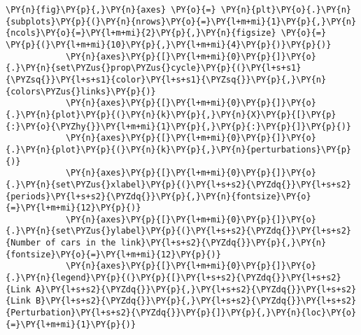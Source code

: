 \begin{Verbatim}[commandchars=\\\{\}]
            \PY{n}{fig}\PY{p}{,}\PY{n}{axes} \PY{o}{=} \PY{n}{plt}\PY{o}{.}\PY{n}{subplots}\PY{p}{(}\PY{n}{nrows}\PY{o}{=}\PY{l+m+mi}{1}\PY{p}{,}\PY{n}{ncols}\PY{o}{=}\PY{l+m+mi}{2}\PY{p}{,}\PY{n}{figsize} \PY{o}{=} \PY{p}{(}\PY{l+m+mi}{10}\PY{p}{,}\PY{l+m+mi}{4}\PY{p}{)}\PY{p}{)}
            \PY{n}{axes}\PY{p}{[}\PY{l+m+mi}{0}\PY{p}{]}\PY{o}{.}\PY{n}{set\PYZus{}prop\PYZus{}cycle}\PY{p}{(}\PY{l+s+s1}{\PYZsq{}}\PY{l+s+s1}{color}\PY{l+s+s1}{\PYZsq{}}\PY{p}{,}\PY{n}{colors\PYZus{}links}\PY{p}{)}
            \PY{n}{axes}\PY{p}{[}\PY{l+m+mi}{0}\PY{p}{]}\PY{o}{.}\PY{n}{plot}\PY{p}{(}\PY{n}{k}\PY{p}{,}\PY{n}{X}\PY{p}{[}\PY{p}{:}\PY{o}{\PYZhy{}}\PY{l+m+mi}{1}\PY{p}{,}\PY{p}{:}\PY{p}{]}\PY{p}{)}
            \PY{n}{axes}\PY{p}{[}\PY{l+m+mi}{0}\PY{p}{]}\PY{o}{.}\PY{n}{plot}\PY{p}{(}\PY{n}{k}\PY{p}{,}\PY{n}{perturbations}\PY{p}{)}
            \PY{n}{axes}\PY{p}{[}\PY{l+m+mi}{0}\PY{p}{]}\PY{o}{.}\PY{n}{set\PYZus{}xlabel}\PY{p}{(}\PY{l+s+s2}{\PYZdq{}}\PY{l+s+s2}{periods}\PY{l+s+s2}{\PYZdq{}}\PY{p}{,}\PY{n}{fontsize}\PY{o}{=}\PY{l+m+mi}{12}\PY{p}{)}
            \PY{n}{axes}\PY{p}{[}\PY{l+m+mi}{0}\PY{p}{]}\PY{o}{.}\PY{n}{set\PYZus{}ylabel}\PY{p}{(}\PY{l+s+s2}{\PYZdq{}}\PY{l+s+s2}{Number of cars in the link}\PY{l+s+s2}{\PYZdq{}}\PY{p}{,}\PY{n}{fontsize}\PY{o}{=}\PY{l+m+mi}{12}\PY{p}{)}
            \PY{n}{axes}\PY{p}{[}\PY{l+m+mi}{0}\PY{p}{]}\PY{o}{.}\PY{n}{legend}\PY{p}{(}\PY{p}{[}\PY{l+s+s2}{\PYZdq{}}\PY{l+s+s2}{Link A}\PY{l+s+s2}{\PYZdq{}}\PY{p}{,}\PY{l+s+s2}{\PYZdq{}}\PY{l+s+s2}{Link B}\PY{l+s+s2}{\PYZdq{}}\PY{p}{,}\PY{l+s+s2}{\PYZdq{}}\PY{l+s+s2}{Perturbation}\PY{l+s+s2}{\PYZdq{}}\PY{p}{]}\PY{p}{,}\PY{n}{loc}\PY{o}{=}\PY{l+m+mi}{1}\PY{p}{)}
            

\end{Verbatim}

